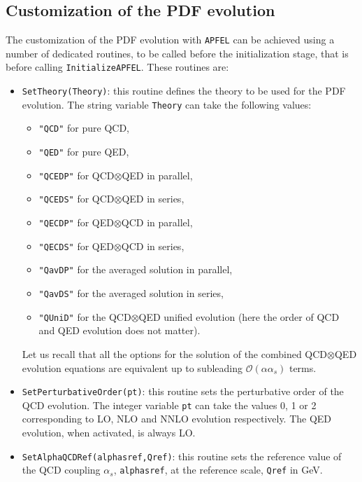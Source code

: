\documentclass[11pt,a4paper]{article}
\newcommand{\lp}{\left(}
\newcommand{\rp}{\right)}
\begin{document}
\subsection{Customization of the PDF evolution}\label{EvolCustom}

%
The customization of the PDF evolution with {\tt APFEL} can be achieved using a number of dedicated 
routines, to be called before the initialization stage, that is before
calling {\tt InitializeAPFEL}.
%
These routines are:
\begin{itemize}

\item {\tt SetTheory(Theory)}: this routine defines the theory to be used
  for the PDF evolution. The string variable {\tt Theory} can take
  the following values:
\begin{itemize}
\item {\tt "QCD"} for pure QCD,
\item {\tt "QED"} for pure QED,
\item {\tt "QCEDP"} for QCD$\otimes$QED in parallel,
\item {\tt "QCEDS"} for QCD$\otimes$QED in series,
\item {\tt "QECDP"} for QED$\otimes$QCD in parallel,
\item {\tt "QECDS"} for QED$\otimes$QCD in series,
\item {\tt "QavDP"} for the averaged solution in parallel,
\item {\tt "QavDS"} for the averaged solution in series,
\item {\tt "QUniD"} for the QCD$\otimes$QED unified evolution (here
  the order of QCD and QED evolution does not matter).
\end{itemize}
Let us recall that all the options for the solution of the combined
QCD$\otimes$QED evolution equations are equivalent up to subleading $\mathcal{O}\lp \alpha \alpha_s\rp$
terms.

\item {\tt SetPerturbativeOrder(pt)}: this routine sets the
  perturbative order of the QCD evolution. 
%
The integer variable {\tt pt} can
  take the values 0, 1 or 2 corresponding to LO, NLO and NNLO
  evolution respectively.
%
The QED evolution, when activated, is always LO.

\item {\tt SetAlphaQCDRef(alphasref,Qref)}: this routine sets the
 reference value of the QCD coupling $\alpha_s$, {\tt alphasref},
 at the reference scale, {\tt Qref} in GeV. 
%


\end{itemize}
\end{document}
